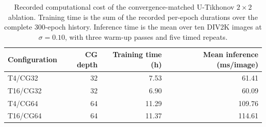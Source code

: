 \begin{table}[htbp]
\centering
\caption{Recorded computational cost of the convergence-matched U-Tikhonov $2\times2$ ablation. Training time is the sum of the recorded per-epoch durations over the complete 300-epoch history. Inference time is the mean over ten DIV2K images at $\sigma=0.10$, with three warm-up passes and five timed repeats.}
\label{tab:u_tikhonov_ablation_cost}
\begin{tabular}{lrrr}
\toprule
Configuration & CG depth & Training time (h) & Mean inference (ms/image) \\
\midrule
T4/CG32 & 32 & 7.53 & 61.41 \\
T16/CG32 & 32 & 6.90 & 60.09 \\
T4/CG64 & 64 & 11.29 & 109.76 \\
T16/CG64 & 64 & 11.37 & 114.61 \\
\bottomrule
\end{tabular}
\end{table}
